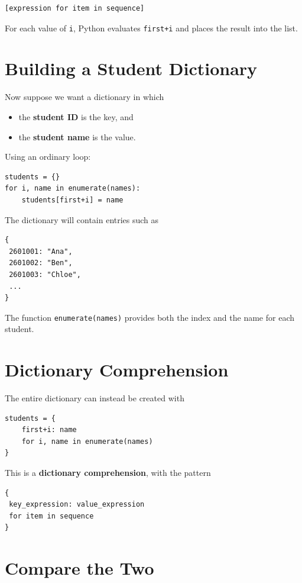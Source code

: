 \documentclass{article}
\begin{document}
\begin{verbatim}
[expression for item in sequence]
\end{verbatim}
\noindent
For each value of \texttt{i}, Python evaluates \texttt{first+i} and places the result into the list.

\section{Building a Student Dictionary}

Now suppose we want a dictionary in which

\begin{itemize}
\item the \textbf{student ID} is the key, and
\item the \textbf{student name} is the value.
\end{itemize}
\noindent
Using an ordinary loop:

\begin{verbatim}
students = {}
for i, name in enumerate(names):
    students[first+i] = name
\end{verbatim}
\noindent
The dictionary will contain entries such as

\begin{verbatim}
{
 2601001: "Ana",
 2601002: "Ben",
 2601003: "Chloe",
 ...
}
\end{verbatim}
\noindent
The function \texttt{enumerate(names)} provides both the index and the name for each student.

\section{Dictionary Comprehension}

The entire dictionary can instead be created with

\begin{verbatim}
students = {
    first+i: name
    for i, name in enumerate(names)
}
\end{verbatim}
\noindent
This is a \textbf{dictionary comprehension}, with the pattern

\begin{verbatim}
{
 key_expression: value_expression
 for item in sequence
}
\end{verbatim}

\section{Compare the Two}
\end{document}
